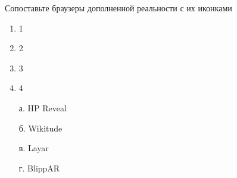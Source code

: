 
Сопоставьте браузеры дополненной реальности с их иконками


\begin{multicols}{2}
    {
        \begin{enumerate}
            \item 1
            \item 2
            \item 3
            \item 4
        \end{enumerate}
    }    
    {
        \begin{enumerate}
            \item[а.] HP Reveal
            \item[б.] Wikitude
            \item[в.] Layar
            \item[г.] BlippAR 
        \end{enumerate}
    }
\end{multicols}